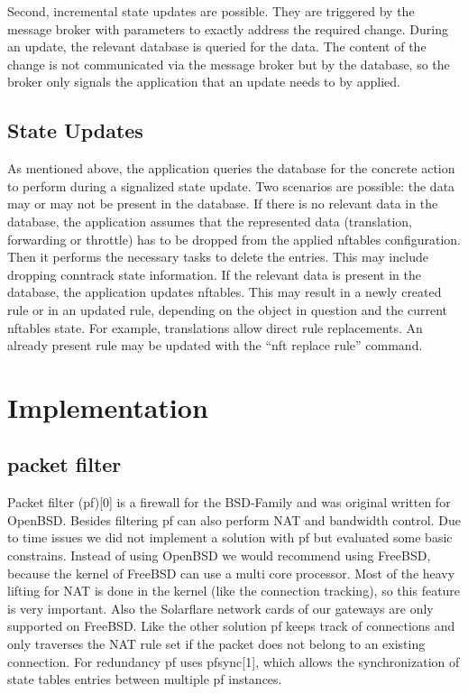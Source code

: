 Second, incremental state updates are possible. They are triggered by
the message broker with parameters to exactly address the required
change. During an update, the relevant database is queried for the data.
The content of the change is not communicated via the message broker but
by the database, so the broker only signals the application that an
update needs to by applied.

\subsection{State Updates}\label{state-updates}

As mentioned above, the application queries the database for the
concrete action to perform during a signalized state update. Two
scenarios are possible: the data may or may not be present in the
database. If there is no relevant data in the database, the application
assumes that the represented data (translation, forwarding or throttle)
has to be dropped from the applied nftables configuration. Then it
performs the necessary tasks to delete the entries. This may include
dropping conntrack state information. If the relevant data is present in
the database, the application updates nftables. This may result in a
newly created rule or in an updated rule, depending on the object in
question and the current nftables state. For example, translations allow
direct rule replacements. An already present rule may be updated with
the ``nft replace rule'' command.

\section{Implementation}\label{implementation}

\subsection{packet filter}\label{packet-filter}

Packet filter (pf){[}0{]} is a firewall for the BSD-Family and was
original written for OpenBSD. Besides filtering pf can also perform NAT
and bandwidth control. Due to time issues we did not implement a
solution with pf but evaluated some basic constrains. Instead of using
OpenBSD we would recommend using FreeBSD, because the kernel of FreeBSD
can use a multi core processor. Most of the heavy lifting for NAT is
done in the kernel (like the connection tracking), so this feature is
very important. Also the Solarflare network cards of our gateways are
only supported on FreeBSD. Like the other solution pf keeps track of
connections and only traverses the NAT rule set if the packet does not
belong to an existing connection. For redundancy pf uses pfsync{[}1{]},
which allows the synchronization of state tables entries between
multiple pf instances.

